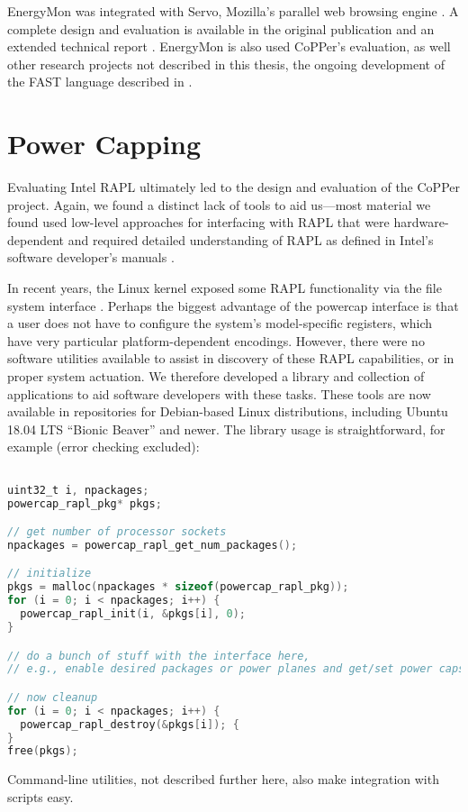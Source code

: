 EnergyMon was integrated with Servo, Mozilla's parallel web browsing engine \cite{servo}.
A complete design and evaluation is available in the original publication \cite{energymon} and an extended technical report \cite{EnergyMonTR}.
EnergyMon is also used CoPPer's evaluation, as well other research projects not described in this thesis, \eg the ongoing development of the FAST language described in .


\section{Power Capping}
\label{app:powercap}

Evaluating Intel RAPL \cite{RAPL} ultimately led to the design and evaluation of the CoPPer project.
Again, we found a distinct lack of tools to aid us---most material we found used low-level approaches for interfacing with RAPL that were hardware-dependent and required detailed understanding of RAPL as defined in Intel's software developer's manuals \cite{intel-sdm}.

In recent years, the Linux kernel exposed some RAPL functionality via the  file system interface \cite{powercap}.
Perhaps the biggest advantage of the powercap interface is that a user does not have to configure the system's model-specific registers, which have very particular platform-dependent encodings.
However, there were no software utilities available to assist in discovery of these RAPL capabilities, or in proper system actuation.
We therefore developed a  library and collection of applications to aid software developers with these tasks.
These tools are now available in repositories for Debian-based Linux distributions, including Ubuntu 18.04 LTS ``Bionic Beaver'' and newer.
The library usage is straightforward, for example (error checking excluded):
%
\begin{lstlisting}[language=C,%
  caption={Basic lifecycle of the powercap library.},%
  morekeywords={uint32_t},%
  label={lst:powercap-example}]%

uint32_t i, npackages;
powercap_rapl_pkg* pkgs;

// get number of processor sockets
npackages = powercap_rapl_get_num_packages();

// initialize
pkgs = malloc(npackages * sizeof(powercap_rapl_pkg));
for (i = 0; i < npackages; i++) {
  powercap_rapl_init(i, &pkgs[i], 0);
}

// do a bunch of stuff with the interface here,
// e.g., enable desired packages or power planes and get/set power caps...

// now cleanup
for (i = 0; i < npackages; i++) {
  powercap_rapl_destroy(&pkgs[i]); {
}
free(pkgs);
\end{lstlisting}
Command-line utilities, not described further here, also make integration with scripts easy.

